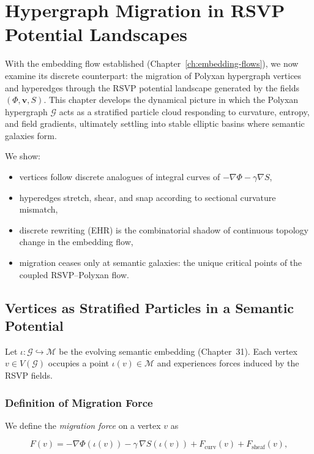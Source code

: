 \chapter{Hypergraph Migration in RSVP Potential Landscapes}
\label{ch:hypergraph-migration}

With the embedding flow established (Chapter~\ref{ch:embedding-flows}), we now
examine its discrete counterpart: the migration of Polyxan hypergraph vertices
and hyperedges through the RSVP potential landscape generated by the fields
$(\Phi,\mathbf{v},S)$.  
This chapter develops the dynamical picture in which the Polyxan hypergraph
$\mathcal{G}$ acts as a stratified particle cloud responding to curvature,
entropy, and field gradients, ultimately settling into stable elliptic basins
where semantic galaxies form.

We show:

\begin{itemize}
\item vertices follow discrete analogues of integral curves of $-\nabla\Phi -\gamma\nabla S$,  
\item hyperedges stretch, shear, and snap according to sectional curvature mismatch,  
\item discrete rewriting (EHR) is the combinatorial shadow of continuous
topology change in the embedding flow,  
\item migration ceases only at semantic galaxies: the unique critical points of
the coupled RSVP--Polyxan flow.
\end{itemize}

\section{Vertices as Stratified Particles in a Semantic Potential}

Let $\iota : \mathcal{G} \hookrightarrow \mathcal{M}$ be the evolving semantic
embedding (Chapter~31).  
Each vertex $v \in V(\mathcal{G})$ occupies a point
$\iota(v)\in\mathcal{M}$ and experiences forces induced by the RSVP fields.

\subsection{Definition of Migration Force}

We define the \emph{migration force} on a vertex $v$ as

\begin{equation}
\label{eq:migration-force}
F(v)
  = -\nabla\Phi(\iota(v))
    - \gamma\,\nabla S(\iota(v))
    + F_{\mathrm{curv}}(v)
    + F_{\mathrm{sheaf}}(v),
\end{equation}

